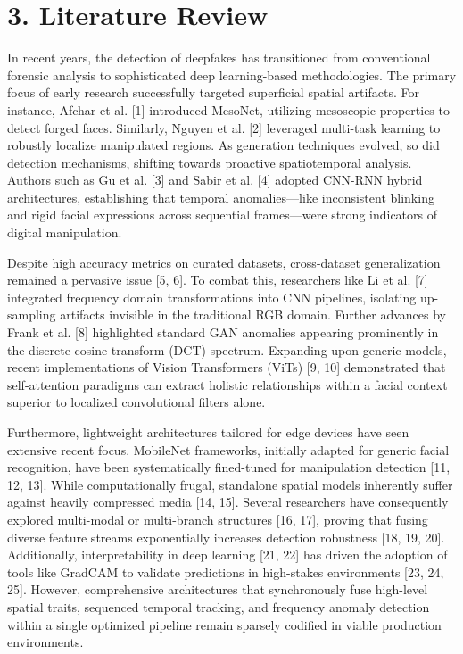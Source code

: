 \documentclass[12pt,a4paper]{article}
\begin{document}
\section{3. Literature Review}
In recent years, the detection of deepfakes has transitioned from conventional forensic analysis to sophisticated deep learning-based methodologies. The primary focus of early research successfully targeted superficial spatial artifacts. For instance, Afchar et al. [1] introduced MesoNet, utilizing mesoscopic properties to detect forged faces. Similarly, Nguyen et al. [2] leveraged multi-task learning to robustly localize manipulated regions. As generation techniques evolved, so did detection mechanisms, shifting towards proactive spatiotemporal analysis. Authors such as Gu et al. [3] and Sabir et al. [4] adopted CNN-RNN hybrid architectures, establishing that temporal anomalies—like inconsistent blinking and rigid facial expressions across sequential frames—were strong indicators of digital manipulation.

Despite high accuracy metrics on curated datasets, cross-dataset generalization remained a pervasive issue [5, 6]. To combat this, researchers like Li et al. [7] integrated frequency domain transformations into CNN pipelines, isolating up-sampling artifacts invisible in the traditional RGB domain. Further advances by Frank et al. [8] highlighted standard GAN anomalies appearing prominently in the discrete cosine transform (DCT) spectrum. Expanding upon generic models, recent implementations of Vision Transformers (ViTs) [9, 10] demonstrated that self-attention paradigms can extract holistic relationships within a facial context superior to localized convolutional filters alone.

Furthermore, lightweight architectures tailored for edge devices have seen extensive recent focus. MobileNet frameworks, initially adapted for generic facial recognition, have been systematically fined-tuned for manipulation detection [11, 12, 13]. While computationally frugal, standalone spatial models inherently suffer against heavily compressed media [14, 15]. Several researchers have consequently explored multi-modal or multi-branch structures [16, 17], proving that fusing diverse feature streams exponentially increases detection robustness [18, 19, 20]. Additionally, interpretability in deep learning [21, 22] has driven the adoption of tools like GradCAM to validate predictions in high-stakes environments [23, 24, 25]. However, comprehensive architectures that synchronously fuse high-level spatial traits, sequenced temporal tracking, and frequency anomaly detection within a single optimized pipeline remain sparsely codified in viable production environments.
\end{document}

